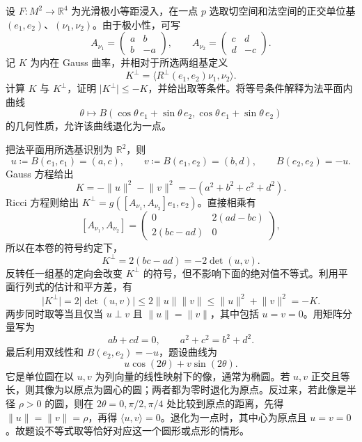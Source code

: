 \begin{exercise}\label{g3:ex:minimal-surface-normal-curvature-bound}
	设 \(F\colon M^2\to\mathbb R^4\) 为光滑极小等距浸入，在一点 \(p\) 选取切空间和法空间的正交单位基 \((e_1,e_2)\)、\((\nu_1,\nu_2)\)。由于极小性，可写
	\[
		A_{\nu_1}=\begin{pmatrix}a&b\\b&-a\end{pmatrix},
		\qquad
		A_{\nu_2}=\begin{pmatrix}c&d\\d&-c\end{pmatrix}.
	\]
	记 \(K\) 为内在 Gauss 曲率，并相对于所选两组基定义
	\[
		K^\perp=\langle R^\perp(e_1,e_2)\nu_1,\nu_2\rangle.
	\]
	计算 \(K\) 与 \(K^\perp\)，证明 \(\lvert K^\perp\rvert\le-K\)，并给出取等条件。将等号条件解释为法平面内曲线
	\[
		\theta\longmapsto
		B(\cos\theta\,e_1+\sin\theta\,e_2,
		  \cos\theta\,e_1+\sin\theta\,e_2)
	\]
	的几何性质，允许该曲线退化为一点。
\end{exercise}
\begin{solution}
	把法平面用所选基识别为 \(\mathbb R^2\)，则
	\[
		u\coloneqq B(e_1,e_1)=(a,c),\qquad
		v\coloneqq B(e_1,e_2)=(b,d),\qquad
		B(e_2,e_2)=-u.
	\]
	Gauss 方程给出
	\[
		K=-\lVert u\rVert^2-\lVert v\rVert^2
		=-(a^2+b^2+c^2+d^2).
	\]
	Ricci 方程则给出 \(K^\perp=g([A_{\nu_1},A_{\nu_2}]e_1,e_2)\)。直接相乘有
	\[
		[A_{\nu_1},A_{\nu_2}]
		=\begin{pmatrix}0&2(ad-bc)\\2(bc-ad)&0\end{pmatrix},
	\]
	所以在本卷的符号约定下，
	\[
		K^\perp=2(bc-ad)=-2\det(u,v).
	\]
	反转任一组基的定向会改变 \(K^\perp\) 的符号，但不影响下面的绝对值不等式。利用平面行列式的估计和平方差，有
	\[
		\lvert K^\perp\rvert
		=2\lvert\det(u,v)\rvert
		\le2\lVert u\rVert\lVert v\rVert
		\le\lVert u\rVert^2+\lVert v\rVert^2=-K.
	\]
	两步同时取等当且仅当 \(u\perp v\) 且 \(\lVert u\rVert=\lVert v\rVert\)，其中包括 \(u=v=0\)。用矩阵分量写为
	\[
		ab+cd=0,\qquad a^2+c^2=b^2+d^2.
	\]
	最后利用双线性和 \(B(e_2,e_2)=-u\)，题设曲线为
	\[
		u\cos(2\theta)+v\sin(2\theta).
	\]
	它是单位圆在以 \(u,v\) 为列向量的线性映射下的像，通常为椭圆。若 \(u,v\) 正交且等长，则其像为以原点为圆心的圆；两者都为零时退化为原点。反过来，若此像是半径 \(\rho>0\) 的圆，则在 \(2\theta=0,\pi/2,\pi/4\) 处比较到原点的距离，先得 \(\lVert u\rVert=\lVert v\rVert=\rho\)，再得 \(\langle u,v\rangle=0\)。退化为一点时，其中心为原点且 \(u=v=0\)。故题设不等式取等恰好对应这一个圆形或点形的情形。
\end{solution}

